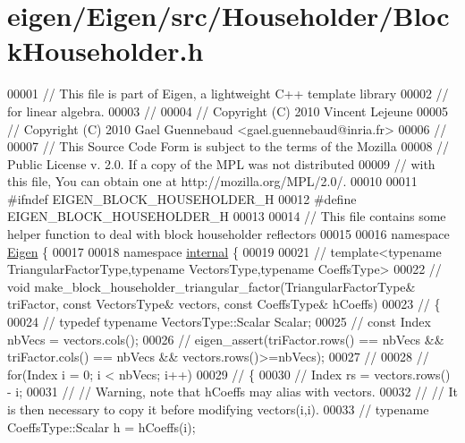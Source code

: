 \hypertarget{eigen_2_eigen_2src_2_householder_2_block_householder_8h_source}{}\section{eigen/\+Eigen/src/\+Householder/\+Block\+Householder.h}
\label{eigen_2_eigen_2src_2_householder_2_block_householder_8h_source}

\begin{DoxyCode}
00001 \textcolor{comment}{// This file is part of Eigen, a lightweight C++ template library}
00002 \textcolor{comment}{// for linear algebra.}
00003 \textcolor{comment}{//}
00004 \textcolor{comment}{// Copyright (C) 2010 Vincent Lejeune}
00005 \textcolor{comment}{// Copyright (C) 2010 Gael Guennebaud <gael.guennebaud@inria.fr>}
00006 \textcolor{comment}{//}
00007 \textcolor{comment}{// This Source Code Form is subject to the terms of the Mozilla}
00008 \textcolor{comment}{// Public License v. 2.0. If a copy of the MPL was not distributed}
00009 \textcolor{comment}{// with this file, You can obtain one at http://mozilla.org/MPL/2.0/.}
00010 
00011 \textcolor{preprocessor}{#ifndef EIGEN\_BLOCK\_HOUSEHOLDER\_H}
00012 \textcolor{preprocessor}{#define EIGEN\_BLOCK\_HOUSEHOLDER\_H}
00013 
00014 \textcolor{comment}{// This file contains some helper function to deal with block householder reflectors}
00015 
00016 \textcolor{keyword}{namespace }\hyperlink{namespace_eigen}{Eigen} \{ 
00017 
00018 \textcolor{keyword}{namespace }\hyperlink{namespaceinternal}{internal} \{
00019   
00021 \textcolor{comment}{// template<typename TriangularFactorType,typename VectorsType,typename CoeffsType>}
00022 \textcolor{comment}{// void make\_block\_householder\_triangular\_factor(TriangularFactorType& triFactor, const VectorsType&
       vectors, const CoeffsType& hCoeffs)}
00023 \textcolor{comment}{// \{}
00024 \textcolor{comment}{//   typedef typename VectorsType::Scalar Scalar;}
00025 \textcolor{comment}{//   const Index nbVecs = vectors.cols();}
00026 \textcolor{comment}{//   eigen\_assert(triFactor.rows() == nbVecs && triFactor.cols() == nbVecs && vectors.rows()>=nbVecs);}
00027 \textcolor{comment}{// }
00028 \textcolor{comment}{//   for(Index i = 0; i < nbVecs; i++)}
00029 \textcolor{comment}{//   \{}
00030 \textcolor{comment}{//     Index rs = vectors.rows() - i;}
00031 \textcolor{comment}{//     // Warning, note that hCoeffs may alias with vectors.}
00032 \textcolor{comment}{//     // It is then necessary to copy it before modifying vectors(i,i). }
00033 \textcolor{comment}{//     typename CoeffsType::Scalar h = hCoeffs(i);}

\end{DoxyCode}
